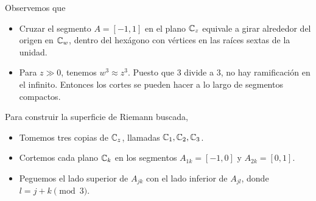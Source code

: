 \begin{solution}
\begin{itemize}
\begin{enumerate}[label=\alph*)]
        Observemos que
        \begin{itemize}
            \item Cruzar el segmento $A = [-1, 1]$ en el plano $\mathbb C_z$ equivale a girar alrededor del origen en $\mathbb C_w$, dentro del hexágono con vértices en las raíces sextas de la unidad.
            
            \item Para $z \gg 0$, tenemos $w^3 \approx z^3$. Puesto que $3$ divide a $3$, no hay ramificación en el infinito. Entonces los cortes se pueden hacer a lo largo de segmentos compactos.
        \end{itemize}
        
        Para construir la superficie de Riemann buscada,
        \begin{itemize}
            \item Tomemos tres copias de $\mathbb C_z$, llamadas $\mathbb C_1, \mathbb C_2, \mathbb C_3$.
            \item Cortemos cada plano $\mathbb C_k$ en los segmentos $A_{1k} = [-1, 0]$ y $A_{2k} = [0, 1]$.
            \item Peguemos el lado superior de $A_{jk}$ con el lado inferior de $A_{jl}$, donde $l = j + k \pmod 3$.
        \end{itemize}
        

\end{enumerate}
\end{itemize}
\end{solution}

